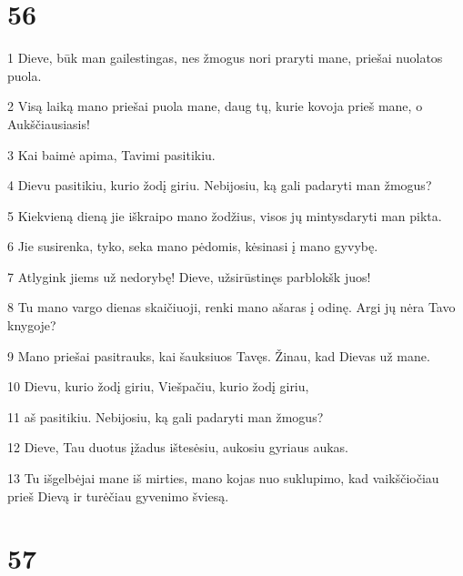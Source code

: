 \chapter{56}


\par 1 Dieve, būk man gailestingas, nes žmogus nori praryti mane, priešai nuolatos puola. 
\par 2 Visą laiką mano priešai puola mane, daug tų, kurie kovoja prieš mane, o Aukščiausiasis! 
\par 3 Kai baimė apima, Tavimi pasitikiu. 
\par 4 Dievu pasitikiu, kurio žodį giriu. Nebijosiu, ką gali padaryti man žmogus? 
\par 5 Kiekvieną dieną jie iškraipo mano žodžius, visos jų mintys­daryti man pikta. 
\par 6 Jie susirenka, tyko, seka mano pėdomis, kėsinasi į mano gyvybę. 
\par 7 Atlygink jiems už nedorybę! Dieve, užsirūstinęs parblokšk juos! 
\par 8 Tu mano vargo dienas skaičiuoji, renki mano ašaras į odinę. Argi jų nėra Tavo knygoje? 
\par 9 Mano priešai pasitrauks, kai šauksiuos Tavęs. Žinau, kad Dievas už mane. 
\par 10 Dievu, kurio žodį giriu, Viešpačiu, kurio žodį giriu, 
\par 11 aš pasitikiu. Nebijosiu, ką gali padaryti man žmogus? 
\par 12 Dieve, Tau duotus įžadus ištesėsiu, aukosiu gyriaus aukas. 
\par 13 Tu išgelbėjai mane iš mirties, mano kojas nuo suklupimo, kad vaikščiočiau prieš Dievą ir turėčiau gyvenimo šviesą.



\chapter{57}


